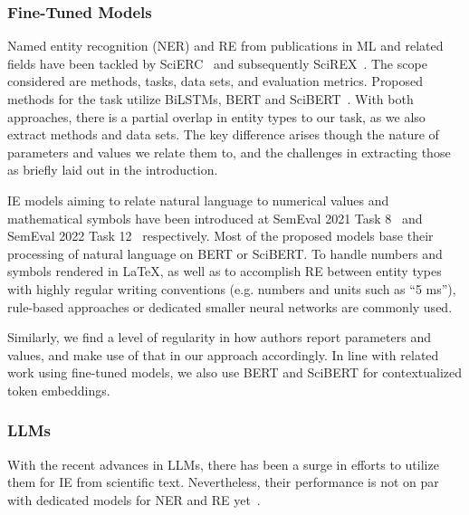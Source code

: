 
\subsubsection{Fine-Tuned Models}



Named entity recognition (NER) and RE from publications in ML and related fields have been tackled by SciERC~\cite{luan2018scierc} and subsequently SciREX~\cite{Jain2020scirex}. The scope considered are methods, tasks, data sets, and evaluation metrics. Proposed methods for the task utilize BiLSTMs, BERT and SciBERT~\cite{Beltagy2019}. With both approaches, there is a partial overlap in entity types to our task, as we also extract methods and data sets. The key difference arises though the nature of parameters and values we relate them to, and the challenges in extracting those as briefly laid out in the introduction.

IE models aiming to relate natural language to numerical values and mathematical symbols have been introduced at SemEval 2021 Task 8~\cite{semeval21_task8} and SemEval 2022 Task 12~\cite{semeval22_task12} respectively. Most of the proposed models base their processing of natural language on BERT or SciBERT. To handle numbers and symbols rendered in \LaTeX, as well as to accomplish RE between entity types with highly regular writing conventions (e.g. numbers and units such as ``5 ms''), rule-based approaches or dedicated smaller neural networks are commonly used.

Similarly, we find a level of regularity in how authors report parameters and values, and make use of that in our approach accordingly. In line with related work using fine-tuned models, we also use BERT and SciBERT for contextualized token embeddings.

\subsubsection{LLMs}

With the recent advances in LLMs, there has been a surge in efforts to utilize them for IE from scientific text. Nevertheless, their performance is not on par with dedicated models for NER and RE yet~\cite{Yang2023}.

